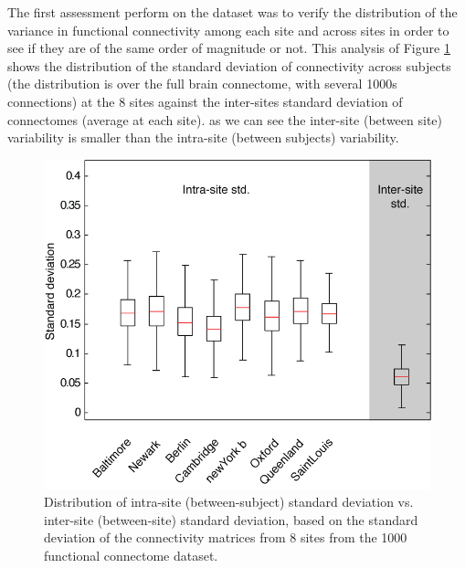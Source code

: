 \documentclass[authoryear]{elsarticle}
\begin{document}


The first assessment perform on the dataset was to verify the distribution of the variance in functional connectivity among each site and across sites in order to see if they are of the same order of magnitude or not. This analysis of Figure \ref{fig_site_variability} shows the distribution of the standard deviation of connectivity across subjects (the distribution is over the full brain connectome, with several 1000s connections) at the 8 sites against the inter-sites standard deviation of connectomes (average at each site). as we can see the inter-site (between site) variability is smaller than the intra-site (between subjects) variability.

\begin{figure}[H]
\begin{center}
\includegraphics[width=\linewidth]{../figures/inter_vs_intra_3tonly.png}
\end{center}
\caption[inter vs. intra site variability]{
  Distribution of intra-site (between-subject) standard deviation vs. inter-site (between-site) standard deviation, based on the standard deviation of the connectivity matrices from 8 sites from the 1000 functional connectome dataset.
}
\label{fig_site_variability}
\end{figure}
\end{document}

